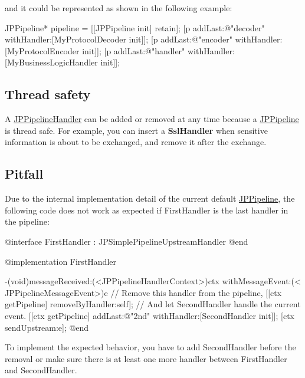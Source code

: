 and it could be represented as shown in the following example:


\begin{DoxyCode}
 JPPipeline* pipeline = [[JPPipeline init] retain];
 [p addLast:@"decoder" withHandler:[MyProtocolDecoder init]];
 [p addLast:@"encoder" withHandler:[MyProtocolEncoder init]];
 [p addLast:@"handler" withHandler:[MyBusinessLogicHandler init]];
\end{DoxyCode}


\subsection*{Thread safety}

A \hyperlink{a00029}{JPPipelineHandler} can be added or removed at any time because a \hyperlink{a00019}{JPPipeline} is thread safe. For example, you can insert a {\bfseries SslHandler} when sensitive information is about to be exchanged, and remove it after the exchange.

\subsection*{Pitfall}

Due to the internal implementation detail of the current default \hyperlink{a00019}{JPPipeline}, the following code does not work as expected if {\ttfamily FirstHandler} is the last handler in the pipeline:


\begin{DoxyCode}
 @interface FirstHandler : JPSimplePipelineUpstreamHandler {}
 @end
 
 @implementation FirstHandler
 
 -(void)messageReceived:(<JPPipelineHandlerContext>)ctx withMessageEvent:(<
      JPPipelineMessageEvent>)e {
         // Remove this handler from the pipeline,
         [[ctx getPipeline] removeByHandler:self];
         // And let SecondHandler handle the current event.
         [[ctx getPipeline] addLast:@"2nd" withHandler:[SecondHandler init]];
         [ctx sendUpstream:e];
 }
 @end
\end{DoxyCode}


To implement the expected behavior, you have to add {\ttfamily SecondHandler} before the removal or make sure there is at least one more handler between {\ttfamily FirstHandler} and {\ttfamily SecondHandler}. 